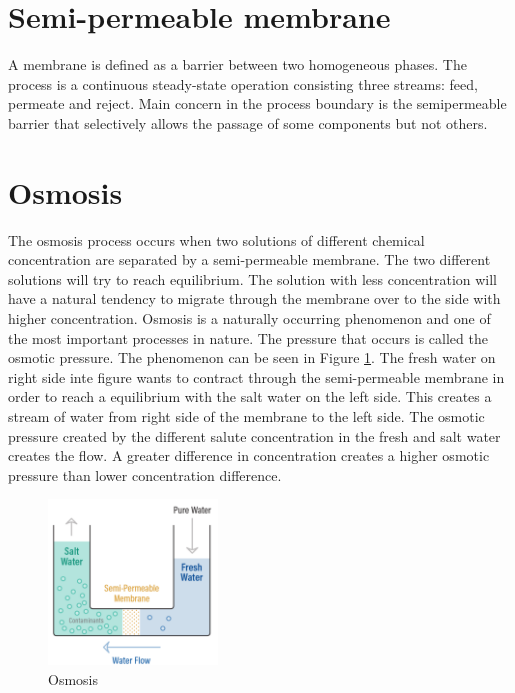 
\section{Semi-permeable membrane}
\label{membrane}
A membrane is defined as a barrier between two homogeneous phases. The process is a continuous steady-state operation consisting three streams: feed, permeate and reject. Main concern in the process boundary is the semipermeable barrier that selectively allows the passage of some components but not others. \cite{Singh}

\section{Osmosis} 
\label{osmosis}
The osmosis process occurs when two solutions of different chemical concentration are separated by a semi-permeable membrane. The two different solutions will try to reach equilibrium. The solution with less concentration will have a natural tendency to migrate through the membrane over to the side with higher concentration.  
Osmosis is a naturally occurring phenomenon and one of the most important processes in nature. The pressure that occurs is called the osmotic pressure. The phenomenon can be seen in Figure \ref{fig:osmosis}. The fresh water on right side inte figure wants to contract through the semi-permeable membrane in order to reach a equilibrium with the salt water on the left side. This creates a stream of water from right side of the membrane to the left side. The osmotic pressure created by the different salute concentration in the fresh and salt water creates the flow. A greater difference in concentration creates a higher osmotic pressure than lower concentration difference.

\begin{figure}[h]
    \centering
    \includegraphics[width=0.4\textwidth]{Osmosis}
    \caption{Osmosis}
    \label{fig:osmosis}
\end{figure}

